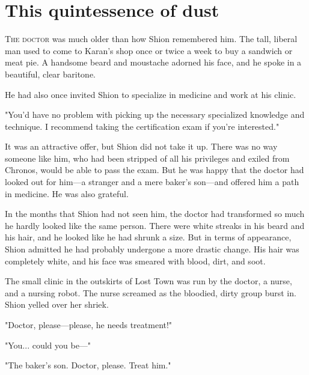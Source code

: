 
\chapter{This quintessence of dust}


\lettrine{T}{he doctor} was much older than how Shion remembered him. The tall,
liberal man used to come to Karan's shop once or twice a week to buy a
sandwich or meat pie. A handsome beard and moustache adorned his face,
and he spoke in a beautiful, clear baritone.

He had also once invited Shion to specialize in medicine and work at his
clinic.

"You'd have no problem with picking up the necessary specialized
knowledge and technique. I recommend taking the certification exam if
you're interested."

It was an attractive offer, but Shion did not take it up. There was no
way someone like him, who had been stripped of all his privileges and
exiled from Chronos, would be able to pass the exam. But he was happy
that the doctor had looked out for him---a stranger and a mere baker's
son---and offered him a path in medicine. He was also grateful.

In the months that Shion had not seen him, the doctor had transformed so
much he hardly looked like the same person. There were white streaks in
his beard and his hair, and he looked like he had shrunk a size. But in
terms of appearance, Shion admitted he had probably undergone a more
drastic change. His hair was completely white, and his face was smeared
with blood, dirt, and soot.

The small clinic in the outskirts of Lost Town was run by the doctor, a
nurse, and a nursing robot. The nurse screamed as the bloodied, dirty
group burst in. Shion yelled over her shriek.

"Doctor, please---please, he needs treatment!"

"You... could you be---"

"The baker's son. Doctor, please. Treat him."

